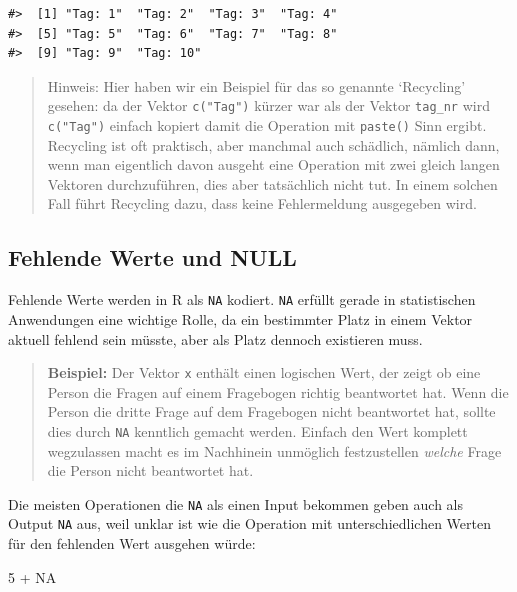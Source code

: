 \documentclass[]{tufte-book}
\newenvironment{Shaded}{}{}
\newcommand{\DecValTok}[1]{\textcolor[rgb]{0.25,0.63,0.44}{#1}}
\newcommand{\StringTok}[1]{\textcolor[rgb]{0.25,0.44,0.63}{#1}}
\newcommand{\OtherTok}[1]{\textcolor[rgb]{0.00,0.44,0.13}{#1}}
\newcommand{\OperatorTok}[1]{\textcolor[rgb]{0.40,0.40,0.40}{#1}}
\begin{document}
\begin{verbatim}
#>  [1] "Tag: 1"  "Tag: 2"  "Tag: 3"  "Tag: 4" 
#>  [5] "Tag: 5"  "Tag: 6"  "Tag: 7"  "Tag: 8" 
#>  [9] "Tag: 9"  "Tag: 10"
\end{verbatim}

\begin{quote}
Hinweis: Hier haben wir ein Beispiel für das so genannte `Recycling'
gesehen: da der Vektor \texttt{c("Tag")} kürzer war als der Vektor
\texttt{tag\_nr} wird \texttt{c("Tag")} einfach kopiert damit die
Operation mit \texttt{paste()} Sinn ergibt. Recycling ist oft praktisch,
aber manchmal auch schädlich, nämlich dann, wenn man eigentlich davon
ausgeht eine Operation mit zwei gleich langen Vektoren durchzuführen,
dies aber tatsächlich nicht tut. In einem solchen Fall führt Recycling
dazu, dass keine Fehlermeldung ausgegeben wird.
\end{quote}

\subsection{Fehlende Werte und NULL}\label{fehlende-werte-und-null}

Fehlende Werte werden in R als \texttt{NA} kodiert. \texttt{NA} erfüllt
gerade in statistischen Anwendungen eine wichtige Rolle, da ein
bestimmter Platz in einem Vektor aktuell fehlend sein müsste, aber als
Platz dennoch existieren muss.

\begin{quote}
\textbf{Beispiel:} Der Vektor \texttt{x} enthält einen logischen Wert,
der zeigt ob eine Person die Fragen auf einem Fragebogen richtig
beantwortet hat. Wenn die Person die dritte Frage auf dem Fragebogen
nicht beantwortet hat, sollte dies durch \texttt{NA} kenntlich gemacht
werden. Einfach den Wert komplett wegzulassen macht es im Nachhinein
unmöglich festzustellen \emph{welche} Frage die Person nicht beantwortet
hat.
\end{quote}

Die meisten Operationen die \texttt{NA} als einen Input bekommen geben
auch als Output \texttt{NA} aus, weil unklar ist wie die Operation mit
unterschiedlichen Werten für den fehlenden Wert ausgehen würde:

\begin{Shaded}
\begin{Highlighting}[]
\DecValTok{5} \OperatorTok{+}\StringTok{ }\OtherTok{NA}
\end{Highlighting}
\end{Shaded}
\end{document}
